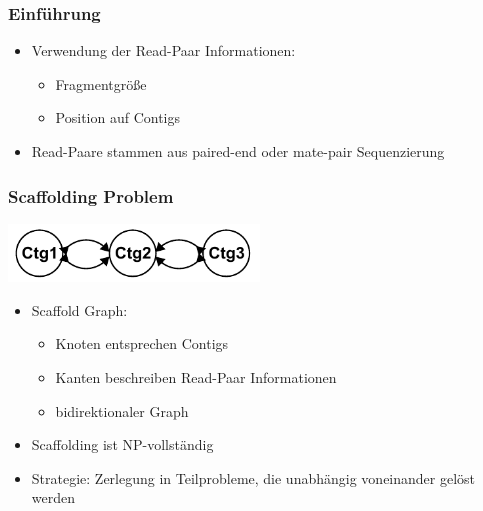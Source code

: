 \documentclass[xcolor=pst]{beamer}
\begin{document}
\begin{frame}
  \frametitle{Einführung}
  \begin{itemize}
  \item Verwendung der Read-Paar Informationen:
    \begin{itemize}
    \item Fragmentgröße
    \item Position auf Contigs
    \end{itemize}
  \item Read-Paare stammen aus paired-end oder mate-pair Sequenzierung
  \end{itemize}
\end{frame}

\begin{frame}
  \frametitle{Scaffolding Problem}
  \begin{center}
    \includegraphics[width=0.5\textwidth,height=0.8\textheight,keepaspectratio]{figures/Scaffolding_3.pdf}
  \end{center}
  \begin{itemize}
  \item Scaffold Graph:
    \begin{itemize}
    \item Knoten entsprechen Contigs
    \item Kanten beschreiben Read-Paar
      Informationen
    \item bidirektionaler Graph
    \end{itemize}
  \item Scaffolding ist NP-vollständig
  \item Strategie: Zerlegung in
    Teilprobleme, die unabhängig voneinander gelöst werden
  \end{itemize}
  \let\thefootnote\relax{}
\end{frame}
\end{document}
